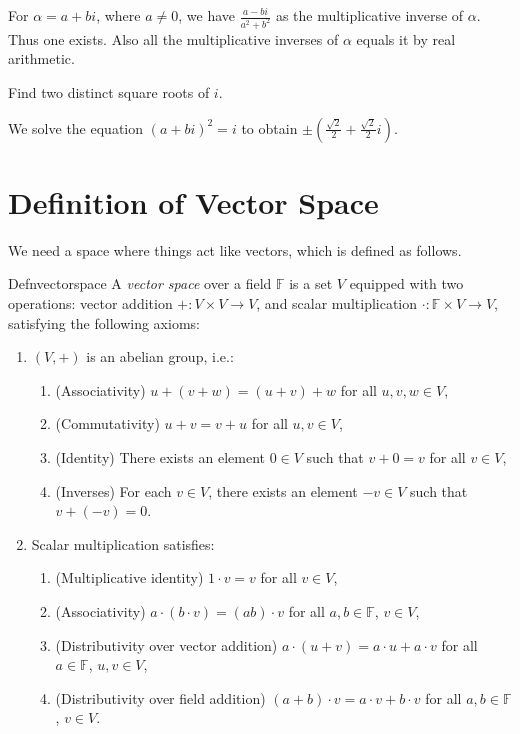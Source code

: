 For $\alpha=a+bi$, where $a\neq0$, we have $\displaystyle\frac{a-bi}{a^2+b^2}$ as the multiplicative inverse of $\alpha$. Thus one exists. Also all the multiplicative inverses of $\alpha$ equals it by real arithmetic.

\setcounter{exercise}{7}

\begin{exercise}
  Find two distinct square roots of $i$.
\end{exercise}

We solve the equation $\left(a+bi\right)^2=i$ to obtain $\pm\left(\displaystyle\frac{\sqrt{2}}{2}+\frac{\sqrt{2}}{2}i\right)$.

\section{Definition of Vector Space}

We need a space where things act like vectors, which is defined as follows.

\begin{reference}{Defn}{vectorspace}
  A \textit{vector space} over a field $\mathbb F$ is a set \( V \) equipped with two operations: vector addition \( + : V \times V \to V \), and scalar multiplication \( \cdot : \mathbb F \times V \to V \), satisfying the following axioms:
  \begin{enumerate}
    \item \((V, +)\) is an abelian group, i.e.:
          \begin{enumerate}
            \item (Associativity) \( u + (v + w) = (u + v) + w \) for all \( u, v, w \in V \),
            \item (Commutativity) \( u + v = v + u \) for all \( u, v \in V \),
            \item (Identity) There exists an element \( 0 \in V \) such that \( v + 0 = v \) for all \( v \in V \),
            \item (Inverses) For each \( v \in V \), there exists an element \( -v \in V \) such that \( v + (-v) = 0 \).
          \end{enumerate}
    \item Scalar multiplication satisfies:
          \begin{enumerate}
            \item (Multiplicative identity) \( 1 \cdot v = v \) for all \( v \in V \),
            \item (Associativity) \( a \cdot (b \cdot v) = (ab) \cdot v \) for all \( a, b \in \mathbb F \), \( v \in V \),
            \item (Distributivity over vector addition) \( a \cdot (u + v) = a \cdot u + a \cdot v \) for all \( a \in \mathbb F \), \( u, v \in V \),
            \item (Distributivity over field addition) \( (a + b) \cdot v = a \cdot v + b \cdot v \) for all \( a, b \in \mathbb F \), \( v \in V \).\qedhere
          \end{enumerate}
  \end{enumerate}
\end{reference}

